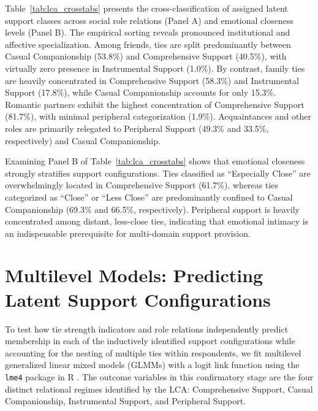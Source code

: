 \documentclass[12pt]{article}
\begin{document}
Table~\ref{tab:lca_crosstabs} presents the cross-classification of assigned latent support classes across social role relations (Panel A) and emotional closeness levels (Panel B). The empirical sorting reveals pronounced institutional and affective specialization. Among friends, ties are split predominantly between Casual Companionship (53.8\%) and Comprehensive Support (40.5\%), with virtually zero presence in Instrumental Support (1.0\%). By contrast, family ties are heavily concentrated in Comprehensive Support (58.3\%) and Instrumental Support (17.8\%), while Casual Companionship accounts for only 15.3\%. Romantic partners exhibit the highest concentration of Comprehensive Support (81.7\%), with minimal peripheral categorization (1.9\%). Acquaintances and other roles are primarily relegated to Peripheral Support (49.3\% and 33.5\%, respectively) and Casual Companionship.

Examining Panel B of Table~\ref{tab:lca_crosstabs} shows that emotional closeness strongly stratifies support configurations. Ties classified as ``Especially Close'' are overwhelmingly located in Comprehensive Support (61.7\%), whereas ties categorized as ``Close'' or ``Less Close'' are predominantly confined to Casual Companionship (69.3\% and 66.5\%, respectively). Peripheral support is heavily concentrated among distant, less-close ties, indicating that emotional intimacy is an indispensable prerequisite for multi-domain support provision.

\section{Multilevel Models: Predicting Latent Support Configurations}

To test how tie strength indicators and role relations independently predict membership in each of the inductively identified support configurations while accounting for the nesting of multiple ties within respondents, we fit multilevel generalized linear mixed models (GLMMs) with a logit link function using the \texttt{lme4} package \citep{bates2015fitting} in \textsf{R} \citep{rcore2026r}. The outcome variables in this confirmatory stage are the four distinct relational regimes identified by the LCA: Comprehensive Support, Casual Companionship, Instrumental Support, and Peripheral Support.
\end{document}
